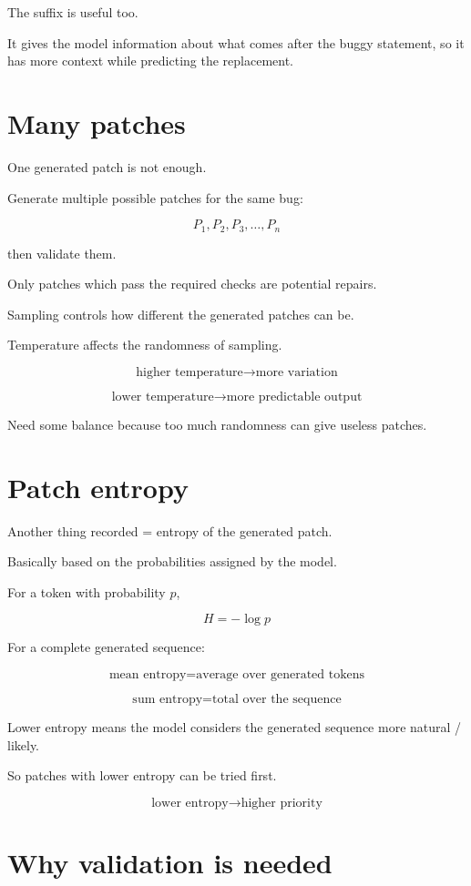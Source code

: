 \documentclass[11pt]{book}
\begin{document}
The suffix is useful too.

It gives the model information about what comes
after the buggy statement, so it has more context
while predicting the replacement.

\section{Many patches}

One generated patch is not enough.

Generate multiple possible patches for the same bug:

\[
P_1,P_2,P_3,\ldots,P_n
\]

then validate them.

Only patches which pass the required checks are
potential repairs.

Sampling controls how different the generated patches
can be.

Temperature affects the randomness of sampling.

\[
\text{higher temperature}
\rightarrow
\text{more variation}
\]

\[
\text{lower temperature}
\rightarrow
\text{more predictable output}
\]

Need some balance because too much randomness can
give useless patches.

\section{Patch entropy}

Another thing recorded = entropy of the generated patch.

Basically based on the probabilities assigned by
the model.

For a token with probability $p$,

\[
H=-\log p
\]

For a complete generated sequence:

\[
\text{mean entropy}
=
\text{average over generated tokens}
\]

\[
\text{sum entropy}
=
\text{total over the sequence}
\]

Lower entropy means the model considers the generated
sequence more natural / likely.

So patches with lower entropy can be tried first.

\[
\text{lower entropy}
\rightarrow
\text{higher priority}
\]

\section{Why validation is needed}
\end{document}
